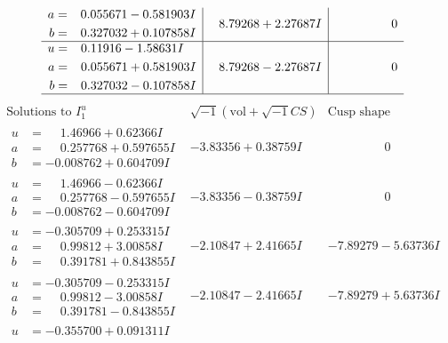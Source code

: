 \documentclass[1p]{elsarticle_modified}
\theoremstyle{definition}
\newcommand{\I}{\sqrt{-1}}
\begin{document}
$$\begin{array}{c|c|c}
\begin{aligned}
a &= \phantom{-}0.055671 - 0.581903 I \\
b &= \phantom{-}0.327032 + 0.107858 I\end{aligned}
 & \phantom{-}8.79268 + 2.27687 I & \phantom{-0.000000 } 0 \\ \hline\begin{aligned}
u &= \phantom{-}0.11916 - 1.58631 I \\
a &= \phantom{-}0.055671 + 0.581903 I \\
b &= \phantom{-}0.327032 - 0.107858 I\end{aligned}
 & \phantom{-}8.79268 - 2.27687 I & \phantom{-0.000000 } 0\\
 \hline 
 \end{array}$$\newpage$$\begin{array}{c|c|c}  
\text{Solutions to }I^u_{1}& \I (\text{vol} + \sqrt{-1}CS) & \text{Cusp shape}\\
 \hline 
\begin{aligned}
u &= \phantom{-}1.46966 + 0.62366 I \\
a &= \phantom{-}0.257768 + 0.597655 I \\
b &= -0.008762 + 0.604709 I\end{aligned}
 & -3.83356 + 0.38759 I & \phantom{-0.000000 } 0 \\ \hline\begin{aligned}
u &= \phantom{-}1.46966 - 0.62366 I \\
a &= \phantom{-}0.257768 - 0.597655 I \\
b &= -0.008762 - 0.604709 I\end{aligned}
 & -3.83356 - 0.38759 I & \phantom{-0.000000 } 0 \\ \hline\begin{aligned}
u &= -0.305709 + 0.253315 I \\
a &= \phantom{-}0.99812 + 3.00858 I \\
b &= \phantom{-}0.391781 + 0.843855 I\end{aligned}
 & -2.10847 + 2.41665 I & -7.89279 - 5.63736 I \\ \hline\begin{aligned}
u &= -0.305709 - 0.253315 I \\
a &= \phantom{-}0.99812 - 3.00858 I \\
b &= \phantom{-}0.391781 - 0.843855 I\end{aligned}
 & -2.10847 - 2.41665 I & -7.89279 + 5.63736 I \\ \hline\begin{aligned}
u &= -0.355700 + 0.091311 I \\

\end{aligned}
\end{array}$$
\end{document}

